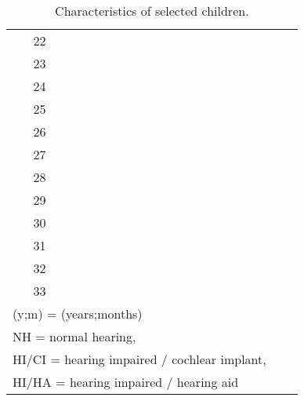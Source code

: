 \begin{table}[h!]
\begin{tabular}{|| c | cccccccc || }
		\rowcolor{gray}
		22 &  &  &  &  &  &  &  &\\ 
		23 &  &  &  &  &  &  &  &\\
		\rowcolor{gray}
		24 &  &  &  &  &  &  &  &\\
		25 &  &  &  &  &  &  &  &\\
		\rowcolor{gray}
		26 &  &  &  &  &  &  &  &\\
		27 &  &  &  &  &  &  &  &\\
		\rowcolor{gray}
		28 &  &  &  &  &  &  &  &\\
		29 &  &  &  &  &  &  &  &\\
		\rowcolor{gray}
		30 &  &  &  &  &  &  &  &\\
		31 &  &  &  &  &  &  &  &\\ 
		\rowcolor{gray}
		32 &  &  &  &  &  &  &  &\\ 
		33 &  &  &  &  &  &  &  &\\
		\hline
		\multicolumn{7}{l}{\footnotesize{(y;m) = (years;months)}} \\
		\multicolumn{7}{l}{\footnotesize{NH = normal hearing,}} \\
		\multicolumn{7}{l}{\footnotesize{HI/CI = hearing impaired / cochlear implant,}} \\
		\multicolumn{7}{l}{\footnotesize{HI/HA = hearing impaired / hearing aid}}
	\end{tabular}
	\caption{Characteristics of selected children.}
	\label{tab:children_char}
\end{table}